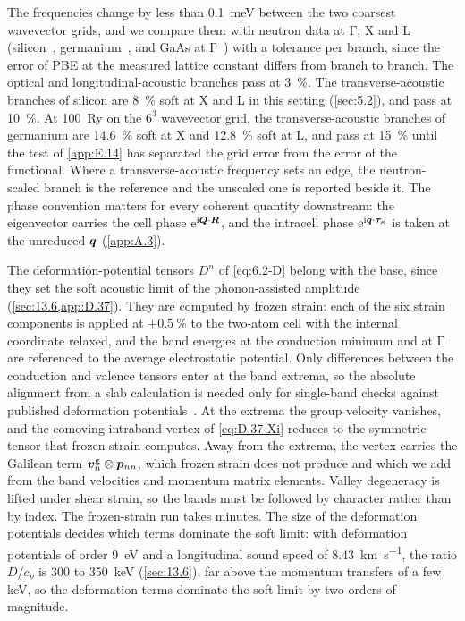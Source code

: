 The frequencies change by less than \SI{0.1}{meV} between the two coarsest wavevector grids, and we compare them with neutron data at $\mathrm{\Gamma}$, X and L (silicon~\cite{nilsson1972study}, germanium~\cite{nilsson1971phonon}, and GaAs at $\mathrm{\Gamma}$~\cite{strauch1990phonon}) with a tolerance per branch, since the error of PBE at the measured lattice constant differs from branch to branch. The optical and longitudinal-acoustic branches pass at \SI{3}{\percent}. The transverse-acoustic branches of silicon are \SI{8}{\percent} soft at X and L in this setting (\cref{sec:5.2}), and pass at \SI{10}{\percent}. At \SI{100}{Ry} on the $6^3$ wavevector grid, the transverse-acoustic branches of germanium are \SI{14.6}{\percent} soft at X and \SI{12.8}{\percent} soft at L, and pass at \SI{15}{\percent} until the test of \cref{app:E.14} has separated the grid error from the error of the functional. Where a transverse-acoustic frequency sets an edge, the neutron-scaled branch is the reference and the unscaled one is reported beside it. The phase convention matters for every coherent quantity downstream: the eigenvector carries the cell phase $\mathrm{e}^{\mathrm{i}\bm{Q}\cdot\bm{R}}$, and the intracell phase $\mathrm{e}^{\mathrm{i}\bm{q}\cdot\bm{\tau}_\kappa}$ is taken at the unreduced $\bm{q}$ (\cref{app:A.3}).

The deformation-potential tensors $D^n$ of \cref{eq:6.2-D} belong with the base, since they set the soft acoustic limit of the phonon-assisted amplitude (\cref{sec:13.6,app:D.37}). They are computed by frozen strain: each of the six strain components is applied at $\pm\SI{0.5}{\percent}$ to the two-atom cell with the internal coordinate relaxed, and the band energies at the conduction minimum and at $\mathrm{\Gamma}$ are referenced to the average electrostatic potential. Only differences between the conduction and valence tensors enter at the band extrema, so the absolute alignment from a slab calculation is needed only for single-band checks against published deformation potentials~\cite{li2021deformation}. At the extrema the group velocity vanishes, and the comoving intraband vertex of \cref{eq:D.37-Xi} reduces to the symmetric tensor that frozen strain computes. Away from the extrema, the vertex carries the Galilean term $\bm{v}^{\mathrm{g}}_n\otimes\bm{p}_{nn}$, which frozen strain does not produce and which we add from the band velocities and momentum matrix elements. Valley degeneracy is lifted under shear strain, so the bands must be followed by character rather than by index. The frozen-strain run takes minutes. The size of the deformation potentials decides which terms dominate the soft limit: with deformation potentials of order \SI{9}{eV} and a longitudinal sound speed of \SI{8.43}{km.s^{-1}}, the ratio $D/c_\nu$ is 300 to \SI{350}{keV} (\cref{sec:13.6}), far above the momentum transfers of a few keV, so the deformation terms dominate the soft limit by two orders of magnitude.

